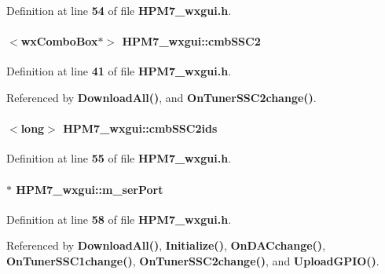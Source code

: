 Definition at line {\bf 54} of file {\bf H\+P\+M7\+\_\+wxgui.\+h}.

\paragraph[{cmb\+S\+S\+C2}]{$<$wx\+Combo\+Box$\ast$$>$ H\+P\+M7\+\_\+wxgui\+::cmb\+S\+S\+C2\hspace{0.3cm}{\ttfamily [protected]}}\label{classHPM7__wxgui_aeee60dca2048d0c662ad4aa0475fe247}


Definition at line {\bf 41} of file {\bf H\+P\+M7\+\_\+wxgui.\+h}.



Referenced by {\bf Download\+All()}, and {\bf On\+Tuner\+S\+S\+C2change()}.

\paragraph[{cmb\+S\+S\+C2ids}]{$<$long$>$ H\+P\+M7\+\_\+wxgui\+::cmb\+S\+S\+C2ids\hspace{0.3cm}{\ttfamily [private]}}\label{classHPM7__wxgui_abf5ec15cbfbb0cf9b494de08e8c1ad26}


Definition at line {\bf 55} of file {\bf H\+P\+M7\+\_\+wxgui.\+h}.

\paragraph[{m\+\_\+ser\+Port}]{$\ast$ H\+P\+M7\+\_\+wxgui\+::m\+\_\+ser\+Port\hspace{0.3cm}{\ttfamily [protected]}}\label{classHPM7__wxgui_ac1b331ebf5f8916357c5206d0f530ce4}


Definition at line {\bf 58} of file {\bf H\+P\+M7\+\_\+wxgui.\+h}.



Referenced by {\bf Download\+All()}, {\bf Initialize()}, {\bf On\+D\+A\+Cchange()}, {\bf On\+Tuner\+S\+S\+C1change()}, {\bf On\+Tuner\+S\+S\+C2change()}, and {\bf Upload\+G\+P\+I\+O()}.

